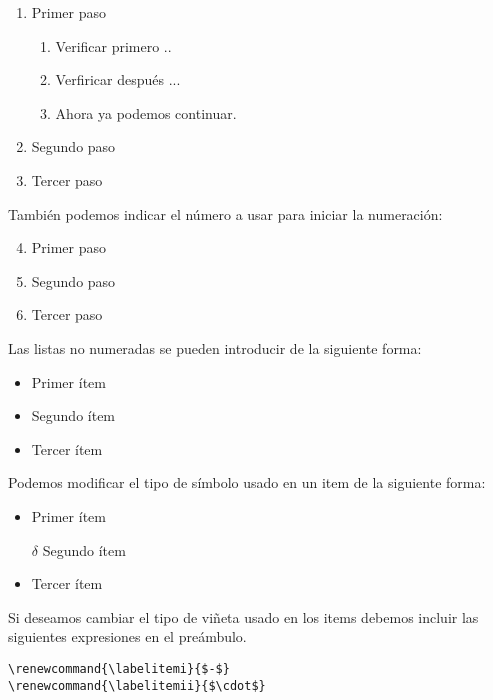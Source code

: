 \documentclass[letterpaper,11pt]{article}
\begin{document}
\begin{•}
\begin{enumerate}
	\item Primer paso
		\begin{enumerate}
			\item Verificar primero ..
			\item Verfiricar después ...
			\item Ahora ya podemos continuar.
		\end{enumerate}
	\item Segundo paso
	\item Tercer paso
\end{enumerate}

También podemos indicar el número a usar para iniciar la numeración:

\begin{enumerate}
	\setcounter{enumi}{3}
	\item Primer paso
	\item Segundo paso
	\item Tercer paso
\end{enumerate}


Las listas no numeradas se pueden introducir de la siguiente forma: 

\begin{itemize}
	\item Primer ítem
	\item Segundo ítem
	\item Tercer ítem
\end{itemize}

Podemos modificar el tipo de símbolo usado en un item de la siguiente forma:

\begin{itemize}
	\item Primer ítem
	\item[$\delta$] Segundo ítem
	\item Tercer ítem
\end{itemize}

Si deseamos cambiar el tipo de viñeta usado en los items debemos incluir las siguientes expresiones en el preámbulo.

\begin{verbatim}
\renewcommand{\labelitemi}{$-$}
\renewcommand{\labelitemii}{$\cdot$}
\end{verbatim}


\end{•}
\end{document}
